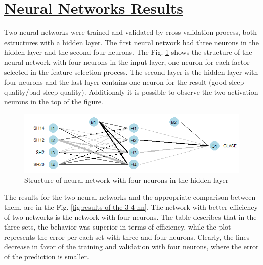 \documentclass[]{book}
\begin{document}
\section{\texorpdfstring{\protect\hyperlink{NN-results}{Neural Networks
Results}}{Neural Networks Results}}\label{neural-networks-results}

Two neural networks were trained and validated by cross validation
process, both estructures with a hidden layer. The first neural network
had three neurons in the hidden layer and the second four neurons. The
Fig. \ref{fig:nn-four-neurons} shows the structure of the neural network
with four neurons in the input layer, one neuron for each factor
selected in the feature selection process. The second layer is the
hidden layer with four neurons and the last layer contains one neuron
for the result (good sleep quality/bad sleep quality). Additionaly it is
possible to observe the two activation neurons in the top of the figure.

\begin{figure}[H]

{\centering \includegraphics[width=0.8\linewidth]{images/nn-four-neurons} 

}

\caption{Structure of neural network with four neurons in the hidden layer}\label{fig:nn-four-neurons}
\end{figure}

The results for the two neural networks and the appropriate comparison
between them, are in the Fig. \ref{fig:results-of-the-3-4-nn}. The
network with better efficiency of two networks is the network with four
neurons. The table describes that in the three sets, the behavior was
superior in terms of efficiency, while the plot represents the error per
each set with three and four neurons. Clearly, the lines decrease in
favor of the training and validation with four neurons, where the error
of the prediction is smaller.
\end{document}
